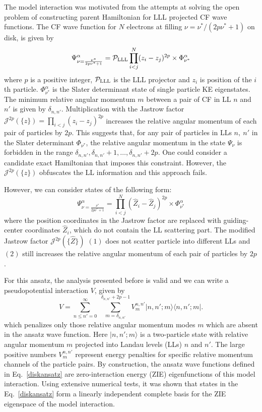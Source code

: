 \documentclass[prb,aps,epsfig,longbibliography,twocolumn]{revtex4-1}
\begin{document}
The model interaction was motivated from the attempts at solving the open problem of constructing parent Hamiltonian for LLL projected CF wave functions. The CF wave function for $N$ electrons at filling $\nu=\nu^*/(2p\nu^*+1)$ on disk, is given by
\begin{equation}
\Psi^{\alpha}_{\nu=\frac{\nu^*}{2p\nu^*+1}} = \mathcal{P}_{\rm LLL} \prod_{i<j}^{N} ({z}_i - {z}_j)^{2p} \times	\Phi^{\alpha}_{\nu^*}  \label{CFstate}
\end{equation}
where $p$ is a positive integer, $\mathcal{P}_{\rm LLL} $ is the LLL projector and $z_i$ is position of the $i$th particle. $\Phi^{\alpha}_{\nu^*} $ is the Slater determinant state of single particle KE eigenstates.  The minimum relative angular momentum $m$ between a pair of CF in LL $n$ and $n'$ is given by $\delta_{n,n'}$.
Multiplication with the Jastrow factor $\mathcal{J}^{2p}(\{z\})=\prod_{i<j} ({z}_i - {z}_j)^{2p}$ increases the relative angular momentum of each pair of particles by $2p$.
This suggests that, for any pair of particles in LLs $n,\ n'$ in the Slater determinant $\Phi_{\nu^*} $, the relative angular momentum in the state $\Psi_{\nu}$ is forbidden in the range $\delta_{n,n'}, \delta_{n,n'} + 1,\dots,\delta_{n,n'}+2p$. One could consider a candidate exact Hamiltonian that imposes this constraint. However, the $\mathcal{J}^{2p}(\{z\})$ obfuscates the LL information and this approach fails. 

However, we can consider states of the following form:
\begin{equation}
\Psi^{\alpha}_{\nu=\frac{\nu^*}{2p\nu^*+1}} = \prod_{i<j}^{N} (\hat{Z}_i - \hat{Z}_j)^{2p} \times	\Phi^{\alpha}_{\nu^*}  \label{diskansatz}
\end{equation}
where the  position coordinates in the Jastrow factor are replaced with guiding-center coordinates $\hat{Z}_i$, which do not contain the LL scattering part. The modified Jastrow factor $\mathcal{J}^{2p}(\{\hat{Z}\})$ $(1)$ does not scatter particle into different LLs and $(2)$ still increases the relative angular momentum of each pair of particles by $2p$.

For this ansatz, the analysis presented before is valid and we can write a pseudopotential interaction $V$, given by
\begin{equation} \label{diskModelInter}
V= \sum_{n\leq n'=0}^{\infty}\;\sum_{m=\delta_{n,n'}}^{\delta_{n,n'}+2p-1} V^{n,n'}_m |n,n';m\rangle \langle n,n';m|.
\end{equation}
which penalizes only those relative angular momentum modes $m$ which are absent in the ansatz wave function. Here $|n,n';m\rangle$ is a two-particle state with relative angular momentum $m$ projected into Landau levels (LLs) $n$ and $n'$. The large positive numbers $V^{n,n'}_m$ represent energy penalties for specific relative momentum channels of the particle pairs. By construction, the ansatz wave functions defined in Eq.~\eqref{diskansatz} are zero-interaction energy (ZIE) eigenfunctions of this model interaction. Using extensive numerical tests, it was shown that states in the Eq.~\eqref{diskansatz} form a linearly independent complete basis for the ZIE eigenspace of the model interaction.
\end{document}
